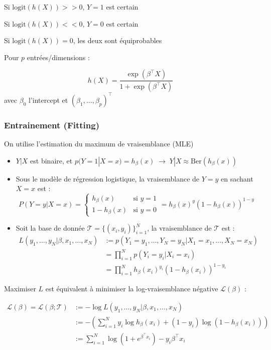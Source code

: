 \documentclass[12pt,a4paper]{article}
\begin{document}
Si $\text{logit}(h(X)) >> 0$, $Y=1$ est certain

Si $\text{logit}(h(X)) << 0$, $Y=0$ est certain

Si $\text{logit}(h(X)) = 0$, les deux sont équiprobables

\medskip

Pour $p$ entrées/dimensions :

$$h(X) = \frac{\exp(\beta^\top X)}{1 + \exp(\beta^\top X)}$$
avec $\beta_0$ l'intercept et $(\beta_1,\dots,\beta_p)^\top$

\subsubsection{Entrainement (Fitting)}

On utilise l'estimation du maximum de vraisemblance (MLE)
\begin{itemize}
    \item $Y|X$ est binaire, et $p(Y=1|X=x) = h_\beta(x) \; \rightarrow \; Y|X \approx \text{Ber}(h_\beta(x))$
    \item Sous le modèle de régression logistique, la vraisemblance de $Y=y$ en sachant $X=x$ est :
    $$P(Y = y | X = x) = \begin{cases} h_{\beta}(x) & \text{si } y = 1 \\ 1 - h_{\beta}(x) & \text{si } y = 0 \end{cases} = h_{\beta}(x)^y (1 - h_{\beta}(x))^{1-y}$$
    \item Soit la base de donnée $\mathcal{T} = \{(x_i,y_i)\}_{i=1}^N$, la vraisemblance de $\mathcal{T}$ est :
    \begin{align*}
    L(y_1, \dots, y_N | \beta, x_1, \dots, x_N) &:= p(Y_1 = y_1, \dots, Y_N = y_N | X_1 = x_1, \dots, X_N = x_N) \\
    &= \prod_{i=1}^{N} p(Y_i = y_i | X_i = x_i) \\
    &= \prod_{i=1}^{N} h_\beta(x_i)^{y_i} (1 - h_\beta(x_i))^{1-y_i}
    \end{align*}
\end{itemize}

Maximiser $L$ est équivalent à minimiser la log-vraisemblance négative $\mathcal{L}(\beta)$ :

\begin{align*}
\mathcal{L}(\beta) = \mathcal{L}(\beta; \mathcal{T}) &:= -\log L(y_1, \dots, y_N | \beta, x_1, \dots, x_N) \\
&:= -\left( \sum_{i=1}^{N} y_i \log h_\beta(x_i) + (1 - y_i) \log(1 - h_\beta(x_i)) \right) \\
&:= \sum_{i=1}^{N} \log(1 + e^{\beta^\top x_i}) - y_i \beta^\top x_i
\end{align*}
\end{document}
